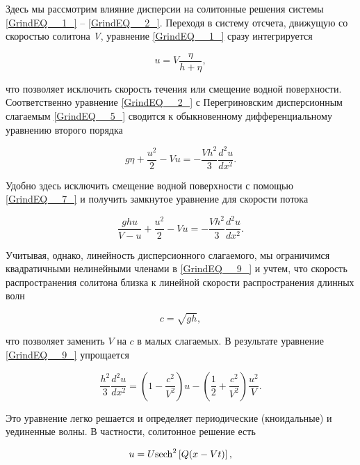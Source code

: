 Здесь мы рассмотрим влияние дисперсии на солитонные решения системы \eqref{GrindEQ__1_} -- \eqref{GrindEQ__2_}. Переходя в систему отсчета, движущую со скоростью солитона \textit{V}, уравнение \eqref{GrindEQ__1_} сразу интегрируется


\begin{equation} \label{GrindEQ__7_}
u=V\frac{\eta }{h+\eta } ,
\end{equation}


 что позволяет исключить скорость течения или смещение водной поверхности. Соответственно уравнение \eqref{GrindEQ__2_} с Перегриновским дисперсионным слагаемым \eqref{GrindEQ__5_} сводится к обыкновенному дифференциальному уравнению второго порядка


\begin{equation} \label{GrindEQ__8_}
g\eta +\frac{u^{2} }{2} -Vu=-\frac{Vh^{2} }{3} \frac{d^{2} u}{dx^{2} } .
\end{equation}


 Удобно здесь исключить смещение водной поверхности с помощью \eqref{GrindEQ__7_} и получить замкнутое уравнение для скорости потока


\begin{equation} \label{GrindEQ__9_}
\frac{ghu}{V-u} +\frac{u^{2} }{2} -Vu=-\frac{Vh^{2} }{3} \frac{d^{2} u}{dx^{2} } .
\end{equation}


 Учитывая, однако, линейность дисперсионного слагаемого, мы ограничимся квадратичными нелинейными членами в \eqref{GrindEQ__9_} и учтем, что скорость распространения солитона близка к линейной скорости распространения длинных волн


\begin{equation} \label{GrindEQ__10_}
c=\sqrt{gh} ,
\end{equation}


 что позволяет заменить $V$ на $c$ в малых слагаемых. В результате уравнение \eqref{GrindEQ__9_} упрощается


\begin{equation} \label{GrindEQ__11_}
\frac{h^{2} }{3} \frac{d^{2} u}{dx^{2} } =\left(1-\frac{c^{2} }{V^{2} } \right)u-\left(\frac{1}{2} +\frac{c^{2} }{V^{2} } \right)\frac{u^{2} }{V} .
\end{equation}


 Это уравнение легко решается и определяет периодические (кноидальные) и уединенные волны. В частности, солитонное решение есть


\begin{equation} \label{GrindEQ__12_}
u=U{\rm sech}^{2} \left[Q(x-Vt)\right],
\end{equation}


